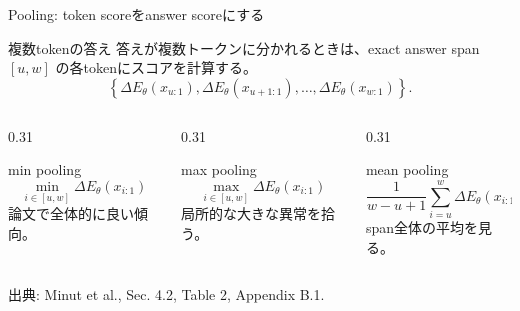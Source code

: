 \documentclass[dvipdfmx,uplatex,unicode,9pt,aspectratio=169]{beamer}
\newcommand{\source}[1]{\vfill{\tiny\color{GrayText}出典: #1}}
\newcommand{\DeltaE}{\Delta E_{\theta}}
\begin{document}
\begin{frame}{Pooling: token scoreをanswer scoreにする}
\begin{block}{複数tokenの答え}
答えが複数トークンに分かれるときは、exact answer span $[u,w]$ の各tokenにスコアを計算する。
\[
 \left\{\DeltaE(x_{u:1}),\DeltaE(x_{u+1:1}),\ldots,\DeltaE(x_{w:1})\right\}.
\]
\end{block}
\begin{columns}[T,onlytextwidth]
\begin{column}{0.31\linewidth}
\begin{block}{min pooling}
\[
 \min_{i\in[u,w]}\DeltaE(x_{i:1})
\]
論文で全体的に良い傾向。
\end{block}
\end{column}
\begin{column}{0.31\linewidth}
\begin{block}{max pooling}
\[
 \max_{i\in[u,w]}\DeltaE(x_{i:1})
\]
局所的な大きな異常を拾う。
\end{block}
\end{column}
\begin{column}{0.31\linewidth}
\begin{block}{mean pooling}
\[
 \frac{1}{w-u+1}\sum_{i=u}^{w}\DeltaE(x_{i:1})
\]
span全体の平均を見る。
\end{block}
\end{column}
\end{columns}
\vspace{0.4em}
\begin{center}
\end{center}
\source{Minut et al., Sec. 4.2, Table 2, Appendix B.1.}
\end{frame}
\end{document}
